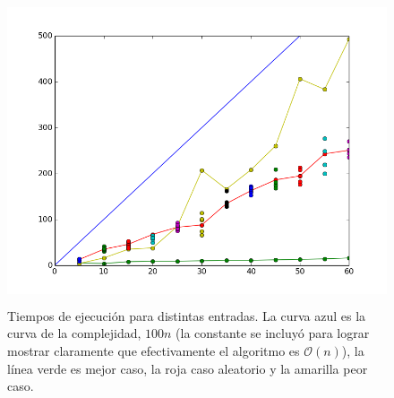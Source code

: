 \documentclass[10pt,a4paper]{article}
\begin{document}
\begin{figure}[h!]
  \centering
  \includegraphics[width=12cm, height=9cm]{GenkiTime}
  \caption{Tiempos de ejecución para distintas entradas. La curva azul es la curva de la complejidad, $100n$ (la constante se incluyó para lograr mostrar claramente que efectivamente el algoritmo es $\mathcal{O}(n)$), la línea verde es mejor caso, la roja caso aleatorio y la amarilla peor caso.}
\end{figure}

\newpage
\end{document}
